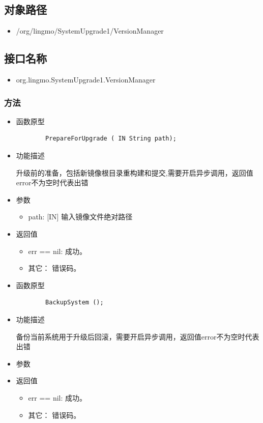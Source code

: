\documentclass{utart}
\begin{document}
\subsection{对象路径}
\begin{itemize}
    \item /org/lingmo/SystemUpgrade1/VersionManager
\end{itemize}

\subsection{接口名称}
\begin{itemize}
    \item org.lingmo.SystemUpgrade1.VersionManager
\end{itemize}

\subsubsection{方法}
\begin{itemize}
    \item 函数原型
    
    \begin{verbatim}
        PrepareForUpgrade ( IN String path);
      \end{verbatim}
    \item 功能描述
    
    升级前的准备，包括新镜像根目录重构建和提交,需要开启异步调用，返回值error不为空时代表出错
    \item 参数
      \begin{itemize}
          \item path: [IN] 输入镜像文件绝对路径
      \end{itemize}
    \item 返回值
      \begin{itemize}
          \item err == nil: 成功。
          \item 其它： 错误码。
      \end{itemize}
\end{itemize}

\begin{itemize}
    \item 函数原型
    
    \begin{verbatim}
        BackupSystem ();
      \end{verbatim}
    \item 功能描述
    
    备份当前系统用于升级后回滚，需要开启异步调用，返回值error不为空时代表出错
    \item 参数
      \begin{itemize}
      \end{itemize}
    \item 返回值
      \begin{itemize}
          \item err == nil: 成功。
          \item 其它： 错误码。
      \end{itemize}
\end{itemize}
\end{document}
